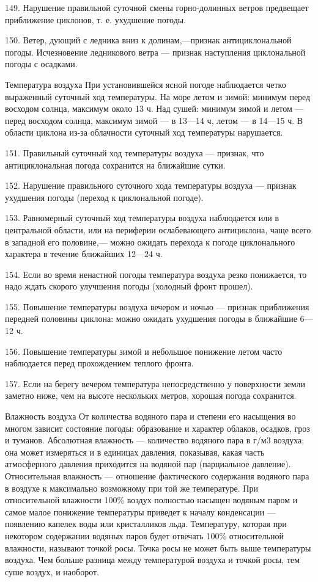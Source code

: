 149. Нарушение правильной суточной смены горно-долинных ветров предвещает приближение циклонов, т. е. ухудшение погоды.

150. Ветер, дующий с ледника вниз к долинам,—признак антициклональной погоды. Исчезновение ледникового ветра — признак наступления циклональной погоды с осадками.

Температура воздуха
При установившейся ясной погоде наблюдается четко выраженный суточный ход температуры. На море летом и зимой: минимум перед восходом солнца, максимум около 13 ч. Над сушей: минимум зимой и летом — перед восходом солнца, максимум зимой — в 13—14 ч, летом — в 14—15 ч. В области циклона из-за облачности суточный ход температуры нарушается.

151. Правильный суточный ход температуры воздуха — признак, что антициклональная погода сохранится на ближайшие сутки.

152. Нарушение правильного суточного хода температуры воздуха — признак ухудшения погоды (переход к циклональной погоде).

153. Равномерный суточный ход температуры воздуха наблюдается или в центральной области, или на периферии ослабевающего антициклона, чаще всего в западной его половине,— можно ожидать перехода к погоде циклонального характера в течение ближайших 12—24 ч.

154. Если во время ненастной погоды температура воздуха резко понижается, то надо ждать скорого улучшения погоды (холодный фронт прошел).

155. Повышение температуры воздуха вечером и ночью — признак приближения передней половины циклона: можно ожидать ухудшения погоды в ближайшие 6— 12 ч.

156. Повышение температуры зимой и небольшое понижение летом часто наблюдается перед прохождением теплого фронта.

157. Если на берегу вечером температура непосредственно у поверхности земли заметно ниже, чем на высоте нескольких метров, хорошая погода сохранится.

Влажность воздуха
От количества водяного пара и степени его насыщения во многом зависит состояние погоды: образование и характер облаков, осадков, гроз и туманов. Абсолютная влажность — количество водяного пара в г/м3 воздуха; она может измеряться и в единицах давления, показывая, какая часть атмосферного давления приходится на водяной пар (парциальное давление). Относительная влажность — отношение фактического содержания водяного пара в воздухе к максимально возможному при той же температуре. При относительной влажности 100\% воздух полностью насыщен водяным паром и самое малое понижение температуры приведет к началу конденсации --- появлению капелек воды или кристалликов льда. Температуру, которая при некотором содержании водяных паров будет отвечать 100\% относительной влажности, называют точкой росы. Точка росы не может быть выше температуры воздуха. Чем больше разница между температурой воздуха и точкой росы, тем суше воздух, и наоборот.

